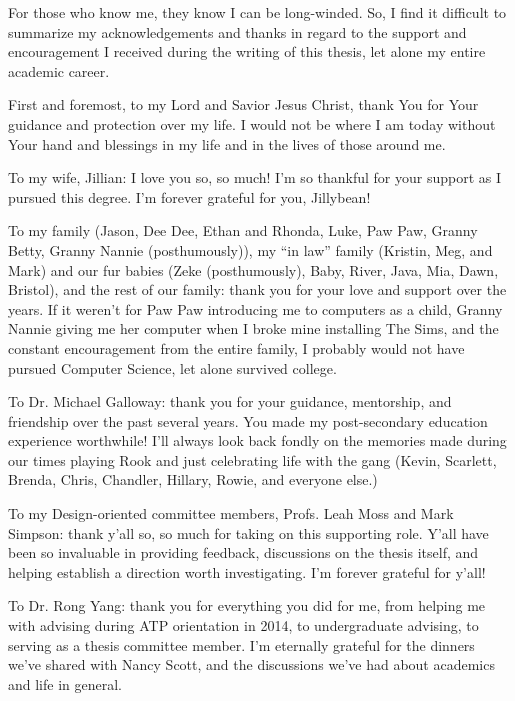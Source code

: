 \par For those who know me, they know I can be long-winded. So, I find it difficult to summarize my acknowledgements and thanks in regard to the support and encouragement I received during the writing of this thesis, let alone my entire academic career.

\par First and foremost, to my Lord and Savior Jesus Christ, thank You for Your guidance and protection over my life. I would not be where I am today without Your hand and blessings in my life and in the lives of those around me.

\par To my wife, Jillian: I love you so, so much! I'm so thankful for your support as I pursued this degree. I'm forever grateful for you, Jillybean!

\par To my family (Jason, Dee Dee, Ethan and Rhonda, Luke, Paw Paw, Granny Betty, Granny Nannie (posthumously)), my ``in law'' family (Kristin, Meg, and Mark) and our fur babies (Zeke (posthumously), Baby, River, Java, Mia, Dawn, Bristol), and the rest of our family: thank you for your love and support over the years. If it weren't for Paw Paw introducing me to computers as a child, Granny Nannie giving me her computer when I broke mine installing The Sims, and the constant encouragement from the entire family, I probably would not have pursued Computer Science, let alone survived college.

\par To Dr. Michael Galloway: thank you for your guidance, mentorship, and friendship over the past several years. You made my post-secondary education experience worthwhile! I'll always look back fondly on the memories made during our times playing Rook and just celebrating life with the gang (Kevin, Scarlett, Brenda, Chris, Chandler, Hillary, Rowie, and everyone else.)

\par To my Design-oriented committee members, Profs. Leah Moss and Mark Simpson: thank y'all so, so much for taking on this supporting role. Y'all have been so invaluable in providing feedback, discussions on the thesis itself, and helping establish a direction worth investigating. I'm forever grateful for y'all!

\par To Dr. Rong Yang: thank you for everything you did for me, from helping me with advising during ATP orientation in 2014, to undergraduate advising, to serving as a thesis committee member. I'm eternally grateful for the dinners we've shared with Nancy Scott, and the discussions we've had about academics and life in general.

